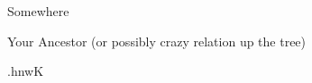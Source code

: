 \documentclass[]{letter}
\begin{document}
\begin{letter}{Somewhere }
\signature{Professor Andrew Benjamin Rosen}

\closing{Your Ancestor (or possibly crazy relation up the tree) }



\begin{cjhebrew}
	.hnwK
\end{cjhebrew}
\end{letter}
\end{document}
